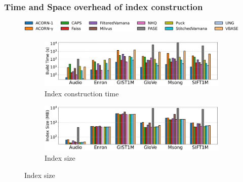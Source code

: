 \documentclass[sigconf, nonacm]{acmart}
\begin{document}
	\subsubsection{Time and Space overhead of index construction}
	\begin{figure}[t]
		\centering
		\setlength{\abovecaptionskip}{0.3cm}
		\setlength{\belowcaptionskip}{0cm}
		
		\hspace*{16pt} %
		\includegraphics[width=0.92\columnwidth]{figures/indexData/legend_only.pdf} %
		
		
		\begin{subfigure}{\columnwidth}
			\centering
			\setlength{\abovecaptionskip}{0cm}
			\setlength{\belowcaptionskip}{-0.1cm}
			\includegraphics[width=0.95\linewidth]{figures/indexData/exp_7_build_time_comparison_query1.pdf}
			\caption{Index construction time}
			\label{fig:build_time_comparison_query1}
		\end{subfigure}
		
		
		
		\begin{subfigure}{\columnwidth}
			\centering
			\setlength{\abovecaptionskip}{0cm}
			\setlength{\belowcaptionskip}{-0.1cm}
			\includegraphics[width=0.95\linewidth]{figures/indexData/exp_7_index_size_mb_comparison_query1.pdf}
			\caption{Index size}
			\label{fig:index_size_mb_comparison_query1}
		\end{subfigure}
		

\end{figure}
\end{document}

